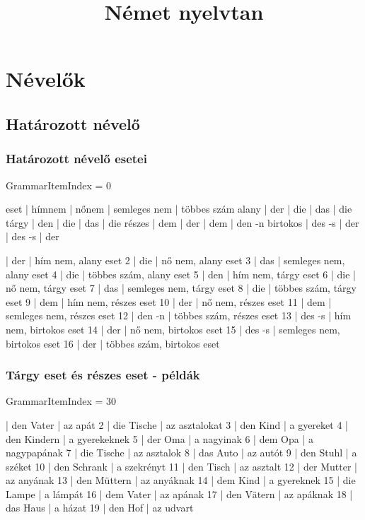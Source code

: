 \documentclass{article}
\title{Német nyelvtan}
\newenvironment{desc}{\verbatim}{\endverbatim}
\newenvironment{exmp}{\verbatim}{\endverbatim}
\begin{document}
\maketitle

\tableofcontents

\section{Névelők}

\subsection{Határozott névelő}

\subsubsection{Határozott névelő esetei}

GrammarItemIndex = 0

\begin{desc}
eset     | hímnem | nőnem | semleges nem | többes szám
alany    | der    | die   | das          | die
tárgy    | den    | die   | das          | die
részes   | dem    | der   | dem          | den -n
birtokos | des -s | der   | des -s       | der
\end{desc}

\begin{exmp}
1 | der | hím nem, alany eset
2 | die | nő nem, alany eset
3 | das | semleges nem, alany eset
4 | die | többes szám, alany eset
5 | den | hím nem, tárgy eset
6 | die | nő nem, tárgy eset
7 | das | semleges nem, tárgy eset
8 | die | többes szám, tárgy eset
9 | dem | hím nem, részes eset
10 | der | nő nem, részes eset
11 | dem | semleges nem, részes eset
12 | den -n | többes szám, részes eset
13 | des -s | hím nem, birtokos eset
14 | der | nő nem, birtokos eset
15 | des -s | semleges nem, birtokos eset
16 | der | többes szám, birtokos eset
\end{exmp}

\subsubsection{Tárgy eset és részes eset - példák}

GrammarItemIndex = 30

\begin{exmp}
1 | den Vater | az apát
2 | die Tische | az asztalokat
3 | den Kind | a gyereket
4 | den Kindern | a gyerekeknek
5 | der Oma | a nagyinak
6 | dem Opa | a nagypapának
7 | die Tische | az asztalok
8 | das Auto | az autót
9 | den Stuhl | a széket
10 | den Schrank | a szekrényt
11 | den Tisch | az asztalt
12 | der Mutter | az anyának
13 | den Müttern | az anyáknak
14 | dem Kind | a gyereknek
15 | die Lampe | a lámpát
16 | dem Vater | az apának
17 | den Vätern | az apáknak
18 | das Haus | a házat
19 | den Hof | az udvart
\end{exmp}
\end{document}
